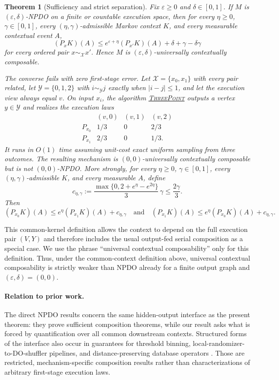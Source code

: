 \documentclass[11pt]{article}
\newtheorem{theorem}{Theorem}[section]
\begin{document}
\begin{theorem}[Sufficiency and strict separation]
\label{thm:main}
Fix $\varepsilon\geq0$ and $\delta\in[0,1]$.  If $M$ is
$(\varepsilon,\delta)$-NPDO on a finite or countable execution space, then for
every $\eta\geq0$, $\gamma\in[0,1]$, every
$(\eta,\gamma)$-admissible Markov context $K$, and every measurable contextual
event $A$,
\[
 (P_xK)(A)
 \leq e^{\varepsilon+\eta}(P_{x'}K)(A)
      +\delta+\gamma-\delta\gamma
\]
for every ordered pair $x\sim_{\mathcal X}x'$.  Hence $M$ is
$(\varepsilon,\delta)$-universally contextually composable.

The converse fails with zero first-stage error.  Let
$\mathcal X=\{x_0,x_1\}$ with every pair related, let
$\mathcal Y=\{0,1,2\}$ with $i\sim_{\mathcal Y}j$ exactly when
$|i-j|\leq1$, and let the execution view always equal $v$.  On input $x_i$,
the algorithm \hyperref[alg:three-point]{\textsc{ThreePoint}} outputs a vertex
$y\in\mathcal Y$ and realizes the execution laws
\[
 \begin{array}{c|ccc}
  & (v,0)&(v,1)&(v,2)\\ \hline
  P_{x_0}&1/3&0&2/3\\
  P_{x_1}&2/3&0&1/3.
 \end{array}
\]
It runs in $O(1)$ time assuming unit-cost exact uniform sampling from three
outcomes.  The resulting mechanism is $(0,0)$-universally contextually
composable but is not $(0,0)$-NPDO.  More strongly, for every $\eta\geq0$,
$\gamma\in[0,1]$, every
$(\eta,\gamma)$-admissible $K$, and every measurable $A$, define
\[
 c_{\eta,\gamma}
 :=\frac{\max\{0,2+e^\eta-e^{2\eta}\}}{3}\,\gamma
 \leq \frac{2\gamma}{3}.
\]
Then
\[
 (P_{x_0}K)(A)\leq e^\eta(P_{x_1}K)(A)+c_{\eta,\gamma}
 \quad\text{and}\quad
 (P_{x_1}K)(A)\leq e^\eta(P_{x_0}K)(A)+c_{\eta,\gamma}.
\]
\end{theorem}

This common-kernel definition allows the context to depend on the full
execution pair $(V,Y)$ and therefore includes the usual output-fed serial
composition as a special case.  We use the phrase ``universal contextual
composability'' only for this definition.  Thus, under the common-context
definition above, universal contextual composability is strictly weaker than
NPDO already for a finite output graph and
$(\varepsilon,\delta)=(0,0)$.

\paragraph{Relation to prior work.}
The direct NPDO results concern the same hidden-output interface as the present
theorem: they prove sufficient composition theorems, while our result asks what
is forced by quantification over all common downstream contexts.  Structured
forms of the interface also occur in guarantees for threshold binning,
local-randomizer-to-DO-shuffler pipelines, and distance-preserving database
operators
\cite{ChanEtAl2022FoundationsDO,GordonEtAl2022PrivacyBlanket,ZhouShi2022DOShuffle,QinEtAl2022Adore}.
Those are restricted, mechanism-specific composition results rather than
characterizations of arbitrary first-stage execution laws.
\end{document}
